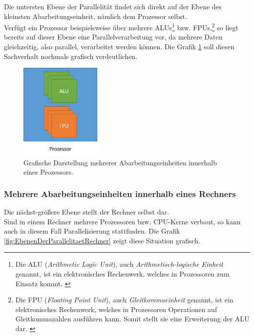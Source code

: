 				Die untersten Ebene der Parallelität findet sich direkt auf der Ebene des kleinsten Abarbeitungseinheit, nämlich dem Prozessor selbst.\\
				Verfügt ein Prozessor beispielsweise über mehrere ALUs\footnote{Die ALU (\textit{Arithmetic Logic Unit}), auch \textit{Arithmetisch-logische Einheit} genannt, ist ein elektronisches Rechenwerk, welches in Prozessoren zum Einsatz kommt. \cite{ALUWikipedia}} bzw. FPUs,\footnote{Die FPU (\textit{Floating Point Unit}), auch \textit{Gleitkommaeinheit} genannt, ist ein elektronisches Rechenwerk, welches in Prozessoren Operationen auf Gleitkommazahlen ausführen kann. Somit stellt sie eine Erweiterung der ALU dar. \cite{FPUWikipedia}} so liegt bereits auf dieser Ebene eine Parallelverarbeitung vor, da mehrere Daten gleichzeitig, also parallel, verarbeitet werden können. Die Grafik \ref{fig:EbenenDerParallelitaetProzessor} soll diesen Sachverhalt nochmals grafisch verdeutlichen.
				
				\begin{figure}
					\centering	
					\includegraphics[width=4cm]{Abbildungen/Ebenen_der_Parallelitaet_Prozessor.png}
					\caption{Grafische Darstellung mehrerer Abarbeitungseinheiten innerhalb eines Prozessors.}
					\label{fig:EbenenDerParallelitaetProzessor}
				\end{figure}
			
			\subsubsection{Mehrere Abarbeitungseinheiten innerhalb eines Rechners}
				\label{MehrereAbarbeitungseinheitenRechner}
			
				Die nächst-größere Ebene stellt der Rechner selbst dar.\\
				Sind in einem Rechner mehrere Prozessoren bzw. CPU-Kerne verbaut, so kann auch in diesem Fall Parallelisierung stattfinden. Die Grafik \ref{fig:EbenenDerParallelitaetRechner} zeigt diese Situation grafisch.
				
